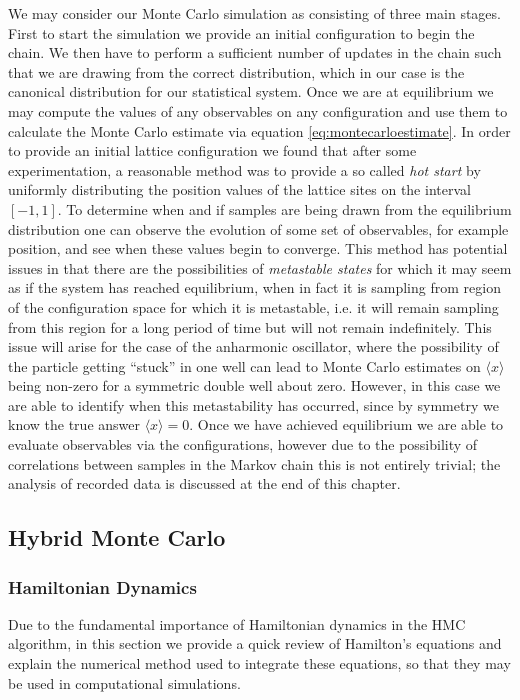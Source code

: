 \documentclass[12pt]{article}
\begin{document}
    We may consider our Monte Carlo simulation as consisting of three main stages. First to start the simulation we provide an initial configuration to begin the chain. We then have to perform a sufficient number of updates in the chain such that we are drawing from the correct distribution, which in our case is the canonical distribution for our statistical system. Once we are at equilibrium we may compute the values of any observables on any configuration and use them to calculate the Monte Carlo estimate via equation \ref{eq:montecarloestimate}. In order to provide an initial lattice configuration we found that after some experimentation, a reasonable method was to provide a so called \textit{hot start} by uniformly distributing the position values of the lattice sites on the interval $\left[-1,1\right]$. To determine when and if samples are being drawn from the equilibrium distribution one can observe the evolution of some set of observables, for example position, and see when these values begin to converge. This method has potential issues in that there are the possibilities of \textit{metastable states} \cite{sokal_1997} for which it may seem as if the system has reached equilibrium, when in fact it is sampling from region of the configuration space for which it is metastable, i.e. it will remain sampling from this region for a long period of time but will not remain indefinitely. This issue will arise for the case of the anharmonic oscillator, where the possibility of the particle getting ``stuck'' in one well can lead to Monte Carlo estimates on $\langle x \rangle$ being non-zero for a symmetric double well about zero. However, in this case we are able to identify when this metastability has occurred, since by symmetry we know the true answer $\langle x \rangle = 0$. Once we have achieved equilibrium we are able to evaluate observables via the configurations, however due to the possibility of correlations between samples in the Markov chain this is not entirely trivial; the analysis of recorded data is discussed at the end of this chapter.



    \subsection{Hybrid Monte Carlo}
        \subsubsection{Hamiltonian Dynamics}
            \label{sec:HamiltonianDynamics}
            Due to the fundamental importance of Hamiltonian dynamics in the HMC algorithm, in this section we provide a quick review of Hamilton's equations and explain the numerical method used to integrate these equations, so that they may be used in computational simulations.
\end{document}
